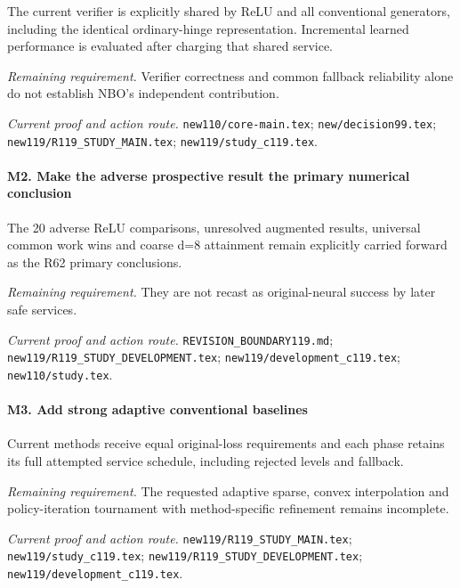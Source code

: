 The current verifier is explicitly shared by ReLU and all conventional generators, including the identical ordinary-hinge representation. Incremental learned performance is evaluated after charging that shared service.

\par\emph{Remaining requirement.} Verifier correctness and common fallback reliability alone do not establish NBO's independent contribution.

\par\emph{Current proof and action route.} \nolinkurl{new110/core-main.tex}; \nolinkurl{new/decision99.tex}; \nolinkurl{new119/R119_STUDY_MAIN.tex}; \nolinkurl{new119/study_c119.tex}.

\paragraph{M2. Make the adverse prospective result the primary numerical conclusion}

The 20 adverse ReLU comparisons, unresolved augmented results, universal common work wins and coarse d=8 attainment remain explicitly carried forward as the R62 primary conclusions.

\par\emph{Remaining requirement.} They are not recast as original-neural success by later safe services.

\par\emph{Current proof and action route.} \nolinkurl{REVISION_BOUNDARY119.md}; \nolinkurl{new119/R119_STUDY_DEVELOPMENT.tex}; \nolinkurl{new119/development_c119.tex}; \nolinkurl{new110/study.tex}.

\paragraph{M3. Add strong adaptive conventional baselines}

Current methods receive equal original-loss requirements and each phase retains its full attempted service schedule, including rejected levels and fallback.

\par\emph{Remaining requirement.} The requested adaptive sparse, convex interpolation and policy-iteration tournament with method-specific refinement remains incomplete.

\par\emph{Current proof and action route.} \nolinkurl{new119/R119_STUDY_MAIN.tex}; \nolinkurl{new119/study_c119.tex}; \nolinkurl{new119/R119_STUDY_DEVELOPMENT.tex}; \nolinkurl{new119/development_c119.tex}.


